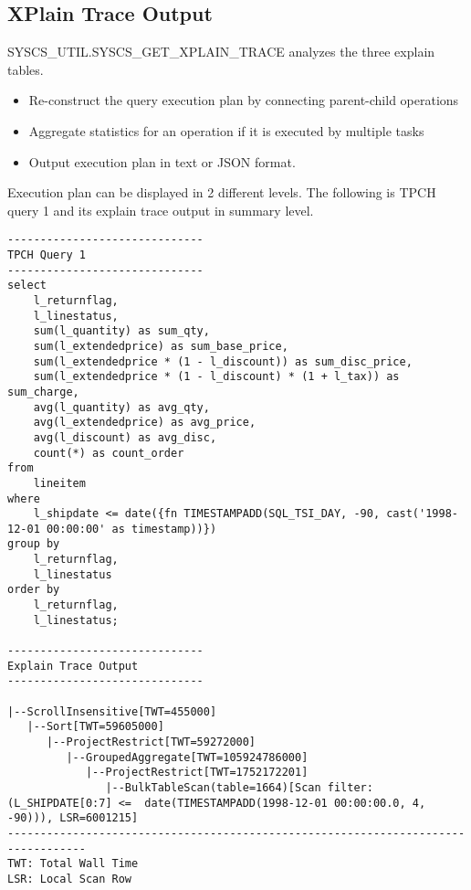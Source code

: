 \documentclass{article}
\begin{document}
\subsection{XPlain Trace Output}
SYSCS\_UTIL.SYSCS\_GET\_XPLAIN\_TRACE analyzes the three explain tables.
\begin{itemize}
  \item Re-construct the query execution plan by connecting parent-child operations
  \item Aggregate statistics for an operation if it is executed by multiple tasks
  \item Output execution plan in text or JSON format.
\end{itemize}
Execution plan can be displayed in 2 different levels. The following is TPCH query 1 and its explain trace output in summary level.
\begin{lstlisting}
------------------------------
TPCH Query 1
------------------------------
select
	l_returnflag,
	l_linestatus,
	sum(l_quantity) as sum_qty,
	sum(l_extendedprice) as sum_base_price,
	sum(l_extendedprice * (1 - l_discount)) as sum_disc_price,
	sum(l_extendedprice * (1 - l_discount) * (1 + l_tax)) as sum_charge,
	avg(l_quantity) as avg_qty,
	avg(l_extendedprice) as avg_price,
	avg(l_discount) as avg_disc,
	count(*) as count_order
from
	lineitem
where
	l_shipdate <= date({fn TIMESTAMPADD(SQL_TSI_DAY, -90, cast('1998-12-01 00:00:00' as timestamp))})
group by
	l_returnflag,
	l_linestatus
order by
	l_returnflag,
	l_linestatus;

------------------------------
Explain Trace Output
------------------------------

|--ScrollInsensitive[TWT=455000]                                                                                                                                                   
   |--Sort[TWT=59605000]                                                            
      |--ProjectRestrict[TWT=59272000]                                                                                                                                      
         |--GroupedAggregate[TWT=105924786000]
            |--ProjectRestrict[TWT=1752172201]                                                                                                                         
               |--BulkTableScan(table=1664)[Scan filter:(L_SHIPDATE[0:7] <=  date(TIMESTAMPADD(1998-12-01 00:00:00.0, 4, -90))), LSR=6001215]
----------------------------------------------------------------------------------
TWT: Total Wall Time      	
LSR: Local Scan Row
\end{lstlisting}
\end{document}
